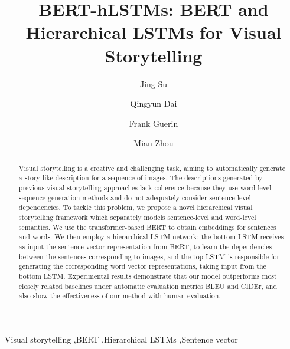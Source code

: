 \documentclass[a4paper,fleqn]{cas-sc}
\begin{document}
\let\WriteBookmarks\relax
\def\floatpagepagefraction{1}
\def\textpagefraction{.001}


\title [mode = title]{BERT-hLSTMs: BERT and Hierarchical LSTMs for Visual Storytelling}                      
\author[1,2]{Jing Su}

\address[1]{Guangdong University of Technology, Panyu District, Guangzhou 510006, China}
\address[2]{Guangdong Ocean University, Mazhang District, Zhanjiang 524088, China}

\author[1]{Qingyun Dai}

\author[3]{Frank Guerin}
\address[3]{University of Surrey, Guildford, Surrey GU2 7XH, United Kingdom}

\author[4]{Mian Zhou}
\cormark[1]

\address[4]{Tianjin University of Technology, Xiqing District, Tianjin 300384, China}



\begin{abstract}
Visual storytelling is a creative and challenging task, aiming to automatically generate a story-like description for a sequence of images. The descriptions generated by previous visual storytelling approaches lack coherence because they use word-level sequence generation methods and do not adequately consider sentence-level dependencies.
To tackle this problem, we propose a novel hierarchical visual storytelling framework which separately models sentence-level and word-level semantics.
We use the transformer-based BERT to obtain embeddings for sentences and words.
We then employ a hierarchical LSTM network: the bottom LSTM receives as input the sentence vector representation from BERT, to learn the dependencies between the sentences corresponding to images, and the top LSTM is responsible for generating the corresponding word vector representations, taking input from the bottom LSTM. 
Experimental results demonstrate that our model outperforms most closely related baselines under  automatic evaluation metrics BLEU and CIDEr, and also show the effectiveness of our method with human evaluation. 

\end{abstract}
\begin{keywords}
Visual storytelling \sep BERT \sep Hierarchical LSTMs \sep Sentence vector 
\end{keywords}
\end{document}
